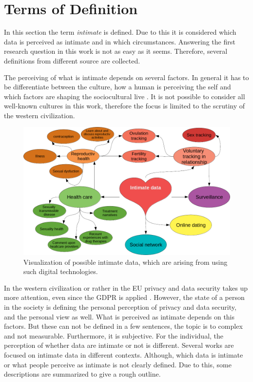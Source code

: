 \section{Terms of Definition}
\label{sec:terms_of_definition}
In this section the term \textit{intimate} is defined. Due to this it is considered which data is perceived as intimate and in which circumstances.
Answering the first research question in this work is not as easy as it seems. Therefore, several definitions from different source are collected.

The perceiving of what is intimate depends on several factors.
In general it has to be differentiate between the culture, how a human is perceiving the self and which factors are shaping the sociocultural live \cite{carrithers1985category}. It is not possible to consider all well-known cultures in this work, therefore the focus is limited to the scrutiny of the western civilization. 
\begin{figure}[htb]
	\centering
	\includegraphics[width=\linewidth]{img/cluster_heart.png}
	\caption{Visualization of possible intimate data, which are arising from using such digital technologies.}
	\label{fig:cluster}
\end{figure}
In the western civilization or rather in the \ac{EU} privacy and data security takes up more attention, even since the \ac{GDPR} is applied \cite{albrecht2016gdpr}.
However, the state of a person in the society is defining the personal perception of privacy and data security, and the personal view as well. What is perceived as intimate depends on this factors.
But these can not be defined in a few sentences, the topic is to complex and not measurable. Furthermore, it is subjective. For the individual, the perception of whether data are intimate or not is different. 
Several works are focused on intimate data in different contexts. Although, which data is intimate or what people perceive as intimate is not clearly defined. Due to this, some descriptions are summarized to give a rough outline.

